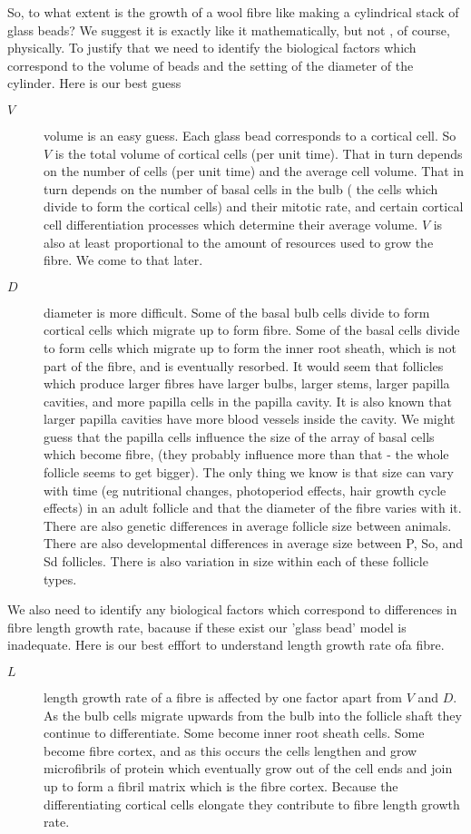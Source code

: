 \documentclass[titlepage]{article}  %
\begin{document}
So, to what extent is the growth of a wool fibre like making a cylindrical stack of glass beads? We suggest it is exactly like it mathematically, but not , of course, physically. To justify that we need to identify the biological factors which correspond to the volume of beads and the setting of the diameter of the cylinder. Here is our best guess
\begin{description}
\item[$V$] volume is an easy guess. Each glass bead corresponds to a cortical cell. So $V$ is the total volume of cortical cells (per unit time). That in turn depends on the number of cells (per unit time) and the average cell volume. That in turn depends on the number of basal cells in the bulb ( the cells which divide to form the cortical cells) and their mitotic rate, and certain cortical cell differentiation processes which determine their average volume. $V$ is also at least proportional to the amount of resources used to grow the fibre. We come to that later.
\item[$D$] diameter is more difficult. Some of the basal bulb cells divide to form cortical cells which migrate up to form fibre. Some of the basal cells divide to form cells which migrate up to form the inner root sheath, which is not part of the fibre, and is eventually resorbed. It would seem that follicles which produce larger fibres have larger bulbs, larger stems, larger papilla cavities, and more papilla cells in the papilla cavity. It is also known that larger papilla cavities have more blood vessels inside the cavity.  We might guess that the papilla cells influence the size of the array of basal cells which become fibre, (they probably influence more than that - the whole follicle seems to get bigger). The only thing we know is that size can vary with time (eg nutritional changes, photoperiod effects, hair growth cycle effects) in an adult follicle and that the diameter of the fibre varies with it. There are also genetic differences in  average follicle size between animals.  There are also developmental differences in average size between P, So, and Sd follicles. There is also variation in size within each of these follicle types.
\end{description}

We also need to identify any biological factors which correspond to differences in fibre length growth rate, bacause if these exist our 'glass bead' model is inadequate. Here is our best efffort to understand length growth rate ofa fibre.
\begin{description}
\item[$L$] length growth rate of a fibre is affected by one factor apart from $V$ and $D$. As the bulb cells migrate upwards from the bulb into the follicle shaft they continue to differentiate. Some become inner root sheath cells. Some become fibre cortex, and as this occurs the cells lengthen and grow microfibrils of protein which eventually grow out of the cell ends and join up to form a fibril matrix which is the fibre cortex. Because the differentiating cortical cells elongate they contribute to fibre length growth rate. 
\end{description}
\end{document}
